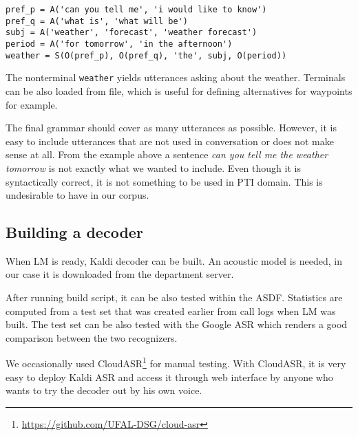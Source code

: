  
\begin{lstlisting}[frame=single]
pref_p = A('can you tell me', 'i would like to know')
pref_q = A('what is', 'what will be')
subj = A('weather', 'forecast', 'weather forecast')
period = A('for tomorrow', 'in the afternoon')
weather = S(O(pref_p), O(pref_q), 'the', subj, O(period))
\end{lstlisting}

The nonterminal \texttt{weather} yields utterances asking about the weather.
Terminals can be also loaded from file, which is useful for defining alternatives for waypoints for example.

The final grammar should cover as many utterances as possible.
However, it is easy to include utterances that are not used in conversation or does not make sense at all.
From the example above a sentence \textit{can you tell me the weather tomorrow} is not exactly what we wanted to include.
Even though it is syntactically correct, it is not something to be used in PTI domain.
This is undesirable to have in our corpus.


\subsection{Building a decoder}

When LM is ready, Kaldi decoder can be built.
An acoustic model is needed, in our case it is downloaded from the department server.

After running build script, it can be also tested within the ASDF.
Statistics are computed from a test set that was created earlier from call logs when LM was built.
The test set can be also tested with the Google ASR which renders a good comparison between the two recognizers.

We occasionally used CloudASR\footnote{\url{https://github.com/UFAL-DSG/cloud-asr}} for manual testing.
With CloudASR, it is very easy to deploy Kaldi ASR and access it through web interface by anyone who wants to try the decoder out by his own voice.


